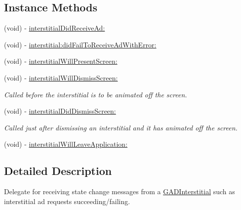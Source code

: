 \subsection*{Instance Methods}
\begin{DoxyCompactItemize}
\item 
(void) -\/ \hyperlink{protocolGADInterstitialDelegate-p_a98354b092876a675aebde6c98a0edae7}{interstitial\+Did\+Receive\+Ad\+:}
\item 
(void) -\/ \hyperlink{protocolGADInterstitialDelegate-p_a9d9273a9f47bfd1343ca4835ae8ce493}{interstitial\+:did\+Fail\+To\+Receive\+Ad\+With\+Error\+:}
\item 
(void) -\/ \hyperlink{protocolGADInterstitialDelegate-p_a52707ba7685e47faea12d47d23f37eb3}{interstitial\+Will\+Present\+Screen\+:}
\item 
\mbox{\label{protocolGADInterstitialDelegate-p_a78d865f86333aeacdadf0e2814e59c07}} 
(void) -\/ \hyperlink{protocolGADInterstitialDelegate-p_a78d865f86333aeacdadf0e2814e59c07}{interstitial\+Will\+Dismiss\+Screen\+:}
\begin{DoxyCompactList}\small\item\em Called before the interstitial is to be animated off the screen. \end{DoxyCompactList}\item 
\mbox{\label{protocolGADInterstitialDelegate-p_ad8149865ad9d400bfe4247dcd4f38256}} 
(void) -\/ \hyperlink{protocolGADInterstitialDelegate-p_ad8149865ad9d400bfe4247dcd4f38256}{interstitial\+Did\+Dismiss\+Screen\+:}
\begin{DoxyCompactList}\small\item\em Called just after dismissing an interstitial and it has animated off the screen. \end{DoxyCompactList}\item 
(void) -\/ \hyperlink{protocolGADInterstitialDelegate-p_afa81174a6e911fd9702e7c924ab68eae}{interstitial\+Will\+Leave\+Application\+:}
\end{DoxyCompactItemize}


\subsection{Detailed Description}
Delegate for receiving state change messages from a \hyperlink{interfaceGADInterstitial}{G\+A\+D\+Interstitial} such as interstitial ad requests succeeding/failing. 

